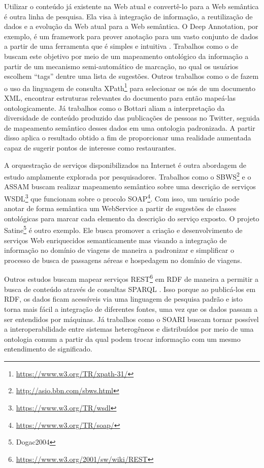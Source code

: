 Utilizar o conteúdo já existente na Web atual e convertê-lo para a Web semântica é outra linha de pesquisa. Ela visa à integração de informação, a reutilização de dados e a evolução da Web atual para a Web semântica. O Deep Annotation, por exemplo, é um framework para prover anotação para um vasto conjunto de dados a partir de uma ferramenta que é simples e intuitiva \citep{Handschuh2003}. Trabalhos como o de \citet{AndreasHess} buscam este objetivo por meio de um mapeamento ontológico da informação a partir de um mecanismo semi-automático de marcação, no qual os usuários escolhem ``tags'' dentre uma lista de sugestões. Outros trabalhos como o de \citet{May} fazem o uso da linguagem de consulta XPath\footnote{\url{https://www.w3.org/TR/xpath-31/}} para selecionar os nós de um documento XML, encontrar estruturas relevantes do documento para então mapeá-las ontologicamente. Já trabalhos como o Bottari \citep{Balduini2012} aliam a interpretação da diversidade de conteúdo produzido das publicações de pessoas no Twitter, seguida de mapeamento semântico desses dados em uma ontologia padronizada. A partir disso aplica o resultado obtido a fim de proporcionar uma realidade aumentada capaz de sugerir pontos de interesse como restaurantes.

A orquestração de serviços disponibilizados na Internet é outra abordagem de estudo amplamente explorada por pesquisadores. Trabalhos como o SBWS\footnote{\url{http://asio.bbn.com/sbws.html}} e o ASSAM \citep{Hess2003, Hess2004} buscam realizar mapeamento semântico sobre uma descrição de serviços WSDL\footnote{\url{https://www.w3.org/TR/wsdl}} que funcionam sobre o procolo SOAP\footnote{\url{https://www.w3.org/TR/soap/}}. Com isso, um usuário pode anotar de forma semântica um WebService a partir de sugestões de classes ontológicas para marcar cada elemento da descrição do serviço exposto. O projeto Satine\footnote{Dogac2004} é outro exemplo. Ele busca promover a criação e desenvolvimento de serviços Web enriquecidos semanticamente mas visando a integração de informação no domínio de viagens de maneira a padronizar e simplificar o processo de busca de passagens aéreas e hospedagem no domínio de viagens.

Outros estudos buscam mapear serviços REST\footnote{\url{https://www.w3.org/2001/sw/wiki/REST}} em RDF de maneira a permitir a busca de conteúdo através de consultas SPARQL \citep{Battle2008}. Isso porque ao publicá-los em RDF, os dados ficam acessíveis via uma linguagem de pesquisa padrão \citep{W3C_SPARQL} e isto torna mais fácil a integração de diferentes fontes, uma vez que os dados passam a ser entendidos por máquinas\citep{Heath2008}. Já trabalhos como o SOARI \citep{Nardin2011} buscam tornar possível a interoperabilidade entre sistemas heterogêneos e distribuídos por meio de uma ontologia comum a partir da qual podem trocar informação com um mesmo entendimento de significado. 

